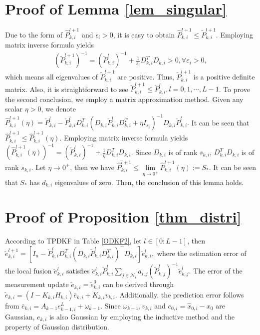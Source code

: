 \documentclass[journal,transmag]{IEEEtran}
\begin{document}
{	\section{Proof of Lemma \ref{lem_singular}}\label{pf_lem_singular}
	Due to the form of $\hat P_{k,i}^{l+1}$ and $\epsilon_i>0$, it is easy to obtain $\hat P_{k,i}^{l+1}\leq \tilde P_{k,i}^{l+1}.$ 		
	Employing  matrix inverse formula yields 
	\begin{align}\label{eq_inverse2}
	(\tilde P_{k,i}^{l+1})^{-1}=(\check P_{k,i}^l)^{-1}+\frac{1}{\varepsilon_i}D_{k,i}^TD_{k,i}>0, \forall \varepsilon_i>0,
	\end{align}
	which means all  eigenvalues of $\tilde P_{k,i}^{l+1}$ are positive. Thus, $\tilde P_{k,i}^{l+1}$  is a positive definite matrix.	
	Also, it is straightforward to see $\tilde P_{k,i}^{l+1}\leq \check P_{k,i}^l, l=0,1,\cdots,L-1$.
	To prove the second conclusion, 
 we employ a matrix approximation method.
	Given any scalar $\eta>0$, we denote $\hat P_{k,i}^{l+1}(\eta)=\check P_{k,i}^l-\check P_{k,i}^lD_{k,i}^T(D_{k,i}\check P_{k,i}^lD_{k,i}^T+\eta I_{s_i})^{-1}D_{k,i}\check P_{k,i}^l.$
	It can be seen that $\hat P_{k,i}^{l+1}\leq\hat P_{k,i}^{l+1}(\eta)$. 
	Employing  matrix inverse formula yields $(\hat P_{k,i}^{l+1}(\eta))^{-1}=(\check P_{k,i}^l)^{-1}+\frac{1}{\eta}D_{k,i}^TD_{k,i}.$
	Since $D_{k,i}$ is of rank  $s_{k,i}$,  $D_{k,i}^TD_{k,i}$ is of rank   $s_{k,i}$. Let $\eta\longrightarrow 0^+$, then we have $\hat P_{k,i}^{l+1}\leq\lim\limits_{\eta\longrightarrow 0^+ }\hat P_{k,i}^{l+1}(\eta):=S_*$.
	It can be seen  that $S_*$ has $d_{k,i}$ eigenvalues of zero. Then, the conclusion of this lemma holds.	
	\section{Proof of Proposition \ref{thm_distri}}\label{pf_pro1}
	{
	According to TPDKF in Table \ref{ODKF2}, let $l\in[0:L-1]$, then 
	$\tilde e_{k,i}^{l+1}=\left[ I_n-\check P_{k,i}^lD_{k,i}^T(D_{k,i}\check P_{k,i}^lD_{k,i}^T)^{-}D_{k,i}\right] \check  e_{k,i}^l,$
	where the estimation  error of the local fusion  $\check e_{k,i}^l$ satisfies
	$\check e_{k,i}^l \check P_{k,i}^l\sum_{j\in \mathcal{N}_{i}}a_{i,j}(\tilde P_{k,j}^l)^{-1}\tilde e_{k,j}^l.$	
	The error of the measurement update $\tilde e_{k,i}=\tilde e_{k,i}^0$ can be derived through
	$\tilde e_{k,i}=(I-K_{k,i}H_{k,i})\bar e_{k,i}+K_{k,i}v_{k,i}.$
	Additionally, the prediction error follows from $\bar e_{k,i}=A_{k-1}e_{k-1,i}^L+\omega_{k-1}.$
	Since $\omega_{k-1},v_{k,i}$ and $e_{0,i}=\hat x_{0,i}-x_{0}$ are Gaussian, $e_{k,i}$ is also Gaussian by employing the inductive method and the property of Gaussian distribution.	
}	

}
\end{document}
